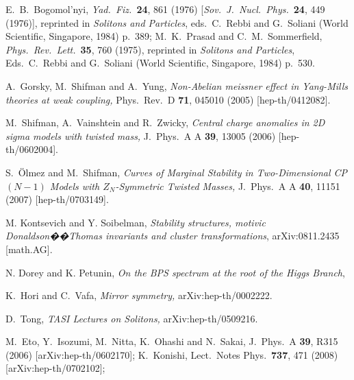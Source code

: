 \documentclass[epsfig,12pt]{article}
\begin{document}
\begin{thebibliography}{99}
      E.~B.~Bogomol'nyi,
{\em Yad.\ Fiz.}\ {\bf 24}, 861  (1976)
[{\em Sov.\ J.\ Nucl.\ Phys.}\  {\bf 24}, 449 (1976)],
reprinted in  {\em  Solitons and
Particles}, eds.\ C.~Rebbi and G.~Soliani 
(World Scientific, Singapore, 1984)
p.~389;
M.~K.~Prasad and C.~M.~Sommerfield,
{\em Phys.\ Rev.\ Lett.}\  {\bf 35}, 760 (1975),
reprinted in  {\em  Solitons and
Particles}, Eds.\ C.~Rebbi and G.~Soliani (World Scientific, Singapore, 1984) 
p.~530.

  A.~Gorsky, M.~Shifman and A.~Yung,
 {\em Non-Abelian meissner effect in Yang-Mills theories at weak coupling,}
  Phys.\ Rev.\ D {\bf 71}, 045010 (2005)
  [hep-th/0412082].

  M.~Shifman, A.~Vainshtein and R.~Zwicky,
{\em Central charge anomalies in 2D sigma models with twisted mass,}
  J.\ Phys.\ A A {\bf 39}, 13005 (2006)
  [hep-th/0602004].
  
S.~\"Olmez and M.~Shifman,
{\em Curves of Marginal Stability in Two-Dimensional CP$(N-1)$ Models with $Z_N$-Symmetric Twisted Masses,}
  J.\ Phys.\ A A {\bf 40}, 11151 (2007)
  [hep-th/0703149].

M.  Kontsevich and Y. Soibelman, 
{\em Stability structures, motivic Donaldson��Thomas invariants and cluster transformations},
arXiv:0811.2435 [math.AG].

N. Dorey and K. Petunin,
{\em On the BPS spectrum at the root of the Higgs Branch},
  
  K.~Hori and C.~Vafa,
{\em Mirror symmetry,}
  arXiv:hep-th/0002222.

D.~Tong,
{\em TASI Lectures on Solitons,}
  arXiv:hep-th/0509216.

  M.~Eto, Y.~Isozumi, M.~Nitta, K.~Ohashi and N.~Sakai,
  J.\ Phys.\ A  {\bf 39}, R315 (2006)
  [arXiv:hep-th/0602170];
K.~Konishi,
  Lect.\ Notes Phys.\  {\bf 737}, 471 (2008)
  [arXiv:hep-th/0702102];


\end{thebibliography}
\end{document}
